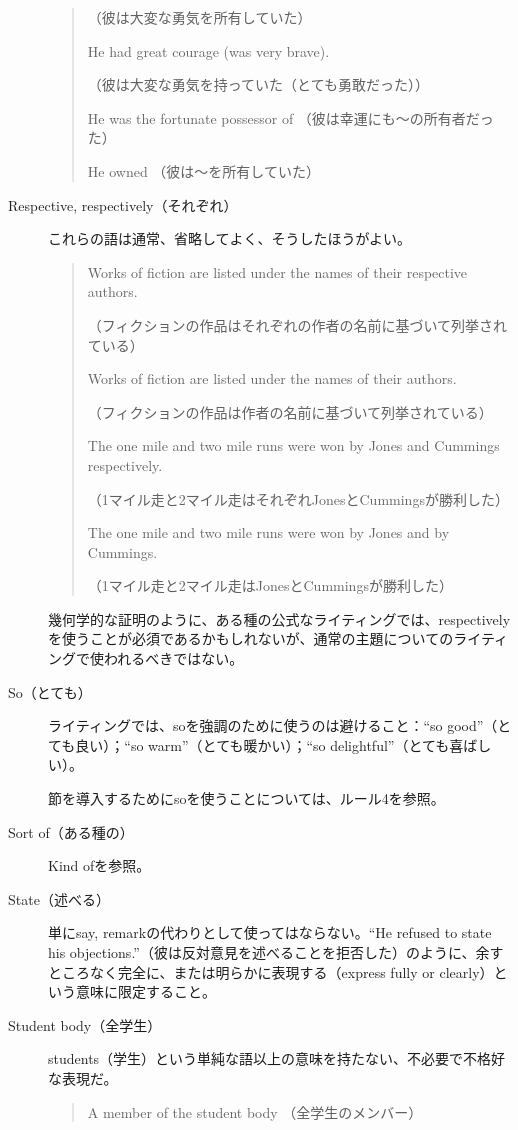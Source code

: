 \begin{description}
\begin{quote}
    （彼は大変な勇気を所有していた）
    
    He had great courage (was very brave).
    
    （彼は大変な勇気を持っていた（とても勇敢だった））
    
    He was the fortunate possessor of
    （彼は幸運にも～の所有者だった）
    
    He owned
    （彼は～を所有していた）
\end{quote}
\item [Respective, respectively（それぞれ）] これらの語は通常、省略してよく、そうしたほうがよい。
\begin{quote}
    Works of fiction are listed under the names of their respective
authors.

（フィクションの作品はそれぞれの作者の名前に基づいて列挙されている）

Works of fiction are listed under the names of their authors.

（フィクションの作品は作者の名前に基づいて列挙されている）

The one mile and two mile runs were won by Jones and Cummings
respectively.

（1マイル走と2マイル走はそれぞれJonesとCummingsが勝利した）

The one mile and two mile runs were won by Jones and by Cummings.

（1マイル走と2マイル走はJonesとCummingsが勝利した）
\end{quote}
幾何学的な証明のように、ある種の公式なライティングでは、respectivelyを使うことが必須であるかもしれないが、通常の主題についてのライティングで使われるべきではない。
\item[So（とても）]ライティングでは、soを強調のために使うのは避けること：``so
good''（とても良い）；``so warm''（とても暖かい）；``so
delightful''（とても喜ばしい）。
\par 節を導入するためにsoを使うことについては、ルール4を参照。
\item[Sort of（ある種の）]Kind ofを参照。
\item[State（述べる）]単にsay, remarkの代わりとして使ってはならない。``He refused to
state his
objections.''（彼は反対意見を述べることを拒否した）のように、余すところなく完全に、または明らかに表現する（express
fully or clearly）という意味に限定すること。
\item[Student body（全学生）]students（学生）という単純な語以上の意味を持たない、不必要で不格好な表現だ。
\begin{quote}
    A member of the student body （全学生のメンバー）
    

\end{quote}
\end{description}

